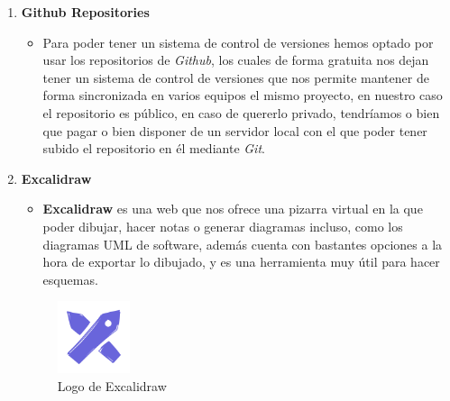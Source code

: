 \documentclass[a4paper]{article}
\begin{document}
\begin{enumerate}
\begin{itemize}
          \end{itemize}
    \item \textbf{Github Repositories}
          \begin{itemize}
              \item Para poder tener un sistema de control de versiones hemos optado por usar los repositorios de \textit{Github}, los cuales de forma gratuita nos dejan tener un sistema de control de versiones que nos permite mantener de forma sincronizada en varios equipos el mismo proyecto, en nuestro caso el repositorio es público, en caso de quererlo privado, tendríamos o bien que pagar o bien disponer de un servidor local con el que poder tener subido el repositorio en él mediante \textit{Git}.
          \end{itemize}
    \item \textbf{Excalidraw}
          \begin{itemize}
              \item \textbf{Excalidraw} es una web que nos ofrece una pizarra virtual en la que poder dibujar, hacer notas o generar diagramas incluso, como los diagramas UML de software, además cuenta con bastantes opciones a la hora de exportar lo dibujado, y es una herramienta muy útil para hacer esquemas.
          \end{itemize}
          \begin{figure}[!ht]
              \centering
              \includegraphics[width=0.2\textwidth]{Images/logoExcalidraw.png}
              \caption{Logo de Excalidraw}
              \label{fig:excalidraw}
          \end{figure}
\end{enumerate}
\clearpage
\end{document}
